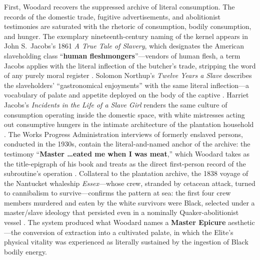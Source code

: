 First, Woodard recovers the suppressed archive of literal consumption. The records of the domestic trade, fugitive advertisements, and abolitionist testimonies are saturated with the rhetoric of consumption, bodily consumption, and hunger. The exemplary nineteenth-century naming of the kernel appears in John S.~Jacobs's 1861 \textit{A True Tale of Slavery}, which designates the American slaveholding class ``\textbf{human fleshmongers}''---vendors of human flesh, a term Jacobs applies with the literal inflection of the butcher's trade, stripping the word of any purely moral register \cite{jacobs_true_tale}. Solomon Northup's \textit{Twelve Years a Slave} describes the slaveholders' ``gastronomical enjoyments'' with the same literal inflection---a vocabulary of palate and appetite deployed on the body of the captive \cite{northup_twelve}. Harriet Jacobs's \textit{Incidents in the Life of a Slave Girl} renders the same culture of consumption operating inside the domestic space, with white mistresses acting out consumptive hungers in the intimate architecture of the plantation household \cite{jacobs_incidents}. The Works Progress Administration interviews of formerly enslaved persons, conducted in the 1930s, contain the literal-and-named anchor of the archive: the testimony ``\textbf{Master \ldots eated me when I was meat},'' which Woodard takes as the title-epigraph of his book and treats as the direct first-person record of the subroutine's operation \cite{woodard_delectable}. Collateral to the plantation archive, the 1838 voyage of the Nantucket whaleship \textit{Essex}---whose crew, stranded by cetacean attack, turned to cannibalism to survive---confirms the pattern at sea: the first four crew members murdered and eaten by the white survivors were Black, selected under a master/slave ideology that persisted even in a nominally Quaker-abolitionist vessel \cite{woodard_delectable}. The system produced what Woodard names a \textbf{Master Epicure} aesthetic---the conversion of extraction into a cultivated palate, in which the Elite's physical vitality was experienced as literally sustained by the ingestion of Black bodily energy.

